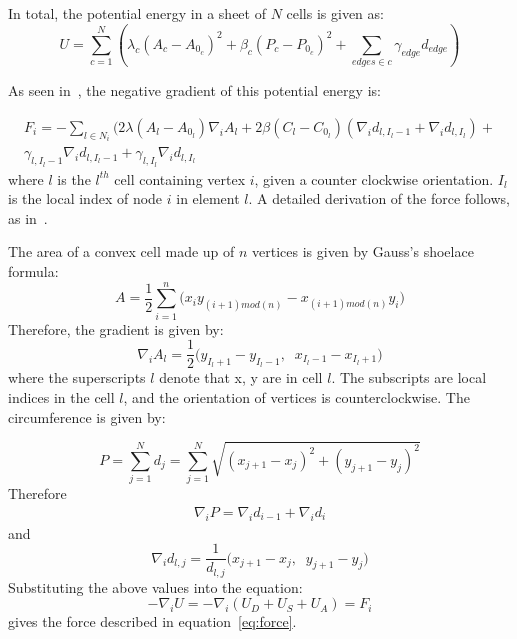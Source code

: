 In total, the potential energy in a sheet of $N$ cells is given as:
\begin{equation*}
U = \sum\limits_{c = 1}^N\left(\lambda_c(A_c - A_{0_c})^2 + \beta_c(P_c - P_{0_c})^2 + \sum_{edges\in c}\gamma_{edge}d_{edge}\right)
\end{equation*}

 As seen in~\cite{ChasteMain}, the negative gradient of this potential energy is:

\begin{equation}
\label{eq:force}
\begin{split}
F_i = -\displaystyle\sum_{l\in N_i}(2\lambda(A_l - A_{0_l})\nabla_iA_l + 2\beta(C_l - C_{0_l})(\nabla_i d_{l, I_l-1}+\nabla_i d_{l, I_l}) +\\ \gamma_{l, I_l-1}\nabla_i d_{l, I_l-1} + \gamma_{l, I_l}\nabla_i d_{l, I_l}
\end{split}
\end{equation} 
where $l$ is the $l^{th}$ cell containing vertex $i$, given a counter clockwise orientation. $I_l$ is the local index of node $i$ in element $l$. A detailed derivation of the force follows, as in~\cite{ChasteMain}.

 The area of a convex cell made up of $n$ vertices is given by Gauss's shoelace formula:
\begin{equation}
A = \frac12\sum\limits_{i=1}^n\Big(x_iy_{(i+1)mod(n)}-x_{(i+1)mod(n)}y_i\Big)
\end{equation}
Therefore, the gradient is given by:
\begin{equation}
\nabla_i A_l = \frac12
\Big(
y_{I_l+1} - y_{I_l-1},\;\;x_{I_l-1} - x_{I_l+1}
\Big)
\end{equation}
 where the superscripts $l$ denote that x, y are in cell $l$. The subscripts are local indices in the cell $l$, and the orientation of vertices is counterclockwise. The circumference is given by:

\begin{equation}
P = \sum\limits_{j=1}^Nd_j = \sum\limits_{j=1}^N\sqrt{(x_{j+1} - x_j)^2 + (y_{j+1} - y_j)^2}
\end{equation}
Therefore
\begin{gather}
\nabla_iP = \nabla_id_{i-1} + \nabla_id_i
\end{gather}
and
\begin{equation}
\nabla_id_{l, j} = \frac1{d_{l, j}}
\Big(
x_{j+1}- x_j,\;\; y_{j+1} - y_j
\Big)
\end{equation}
Substituting the above values into the equation:
\begin{equation}
-\nabla_iU = -\nabla_i(U_D + U_S + U_A) = F_i
\end{equation}
gives the force described in equation~\ref{eq:force}.

